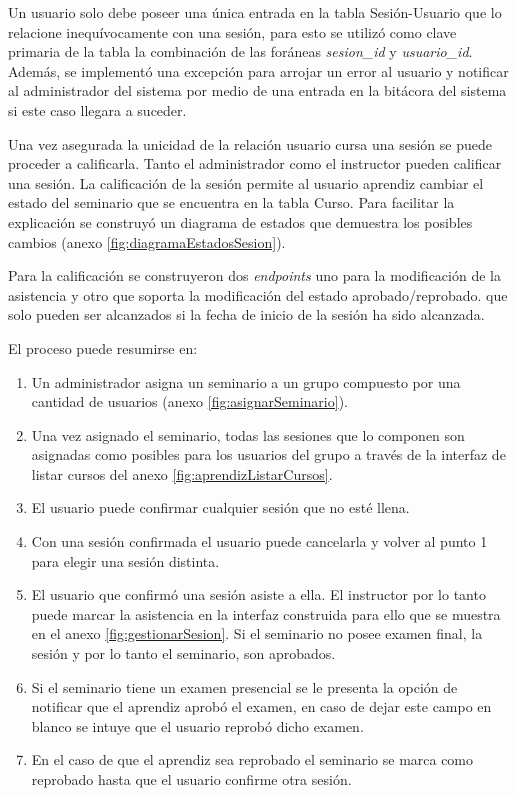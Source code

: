 	Un usuario solo debe poseer una única entrada en la tabla Sesión-Usuario que lo relacione inequívocamente con una sesión, para esto se utilizó como clave primaria de la tabla la combinación de las foráneas \emph{sesion\_id} y \emph{usuario\_id}. Además, se implementó una excepción para arrojar un error al usuario y notificar al administrador del sistema por medio de una entrada en la bitácora del sistema si este caso llegara a suceder.

	Una vez asegurada la unicidad de la relación usuario cursa una sesión se puede proceder a calificarla. Tanto el administrador como el instructor pueden calificar una sesión. La calificación de la sesión permite al usuario aprendiz cambiar el estado del seminario que se encuentra en la tabla Curso. Para facilitar la explicación se construyó un diagrama de estados que demuestra los posibles cambios (anexo \ref{fig:diagramaEstadosSesion}). 

	Para la calificación se construyeron dos \emph{endpoints} uno para la modificación de la asistencia y otro que soporta la modificación del estado aprobado/reprobado. que solo pueden ser alcanzados si la fecha de inicio de la sesión ha sido alcanzada.

	El proceso puede resumirse en:

	\begin{enumerate}
		\item Un administrador asigna un seminario a un grupo compuesto por una cantidad de usuarios (anexo \ref{fig:asignarSeminario}). 
		
		\item Una vez asignado el seminario, todas las sesiones que lo componen son asignadas como posibles para los usuarios del grupo a través de la interfaz de listar cursos del anexo \ref{fig:aprendizListarCursos}.

		\item El usuario puede confirmar cualquier sesión que no esté llena.

		\item Con una sesión confirmada el usuario puede cancelarla y volver al punto 1 para elegir una sesión distinta.

		\item El usuario que confirmó una sesión asiste a ella. El instructor por lo tanto puede marcar la asistencia en la interfaz construida para ello que se muestra en el anexo \ref{fig:gestionarSesion}. Si el seminario no posee examen final, la sesión y por lo tanto el seminario, son aprobados.

		\item Si el seminario tiene un examen presencial se le presenta la opción de notificar que el aprendiz aprobó el examen, en caso de dejar este campo en blanco se intuye que el usuario reprobó dicho examen.

		\item En el caso de que el aprendiz sea reprobado el seminario se marca como reprobado hasta que el usuario confirme otra sesión.

	\end{enumerate}

